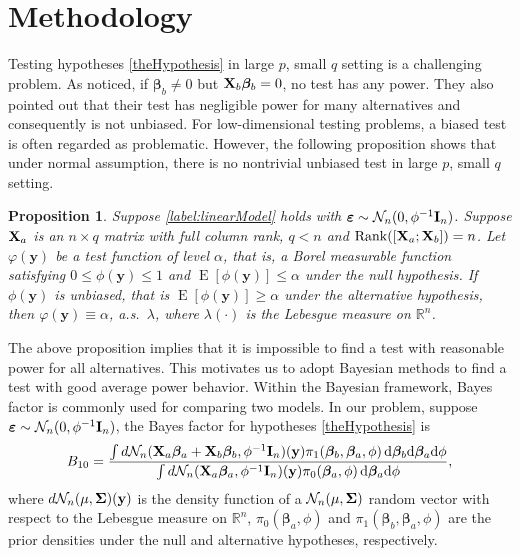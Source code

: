 \documentclass[11pt]{article}
\DeclareMathOperator{\myRank}{Rank}
\DeclareMathOperator{\myE}{E}
\newcommand{\By}{\mathbf{y}}    \newcommand{\Bz}{\mathbf{z}}
\newcommand{\bfsym}[1]{\ensuremath{\boldsymbol{#1}}}
\def\bbeta{\bfsym \beta}
\theoremstyle{plain}
\newtheorem{proposition}{\quad\quad Proposition}
\theoremstyle{definition}
\theoremstyle{remark}
\begin{document}
\section{Methodology}\label{sec:methodology}
Testing hypotheses \eqref{theHypothesis} in large $p$, small $q$ setting is a challenging problem.
As \cite{Goeman2006} noticed, if $\bbeta_b \neq 0$ but $\BX_b \bbeta_b =0$, no test has any power.
They also pointed out that their test has negligible power for many alternatives and consequently is not unbiased.
For low-dimensional testing problems, a biased test is often regarded as problematic.
However, the following proposition shows that under normal assumption, there is no nontrivial unbiased test in large $p$, small $q$ setting.
\begin{proposition}\label{prop:unbiased}
    Suppose \eqref{label:linearModel} holds with
$\bepsilon\sim \mathcal N_n (0, \phi^{-1}\BI_n)$.
Suppose $\mathbf{X}_a$ is an $n\times q$ matrix with full column rank, $q<n$ and $\myRank( [\BX_a;\BX_b])=n$.
Let $\varphi(\By)$ be a test function of level $\alpha$, that is, a Borel measurable function satisfying $0\leq \phi(\By)\leq 1$ and $\myE [\phi(\By)]\leq \alpha$ under the null hypothesis.
If $\phi(\By)$ is unbiased, that is $\myE [\phi(\By)]\geq \alpha$ under the alternative hypothesis, then $\varphi(\By)\equiv\alpha$, a.s.\ $\lambda$, where $\lambda(\cdot)$ is the Lebesgue measure on $\mathbb R^n$.
\end{proposition}
The above proposition implies that it is impossible to find a test with reasonable power for all alternatives.
This motivates us to adopt Bayesian methods %
to find a test with good average power behavior.
Within the Bayesian framework, Bayes factor is commonly used for comparing two models.
In our problem, suppose $\bepsilon \sim \mathcal N_n (0,\phi^{-1} \BI_n)$, the Bayes factor for hypotheses \eqref{theHypothesis} is
\begin{equation*}
    B_{10}= \frac {
        \int d\mathcal N_n(\BX_a\bbeta_a + \BX_b\bbeta_b, \phi^{-1}\BI_n) (\By) \pi_1(\bbeta_b,\bbeta_a,\phi)\, \mathrm d\bbeta_b \mathrm d\bbeta_a \mathrm d\phi
}{
    \int d\mathcal N_n(\BX_a\bbeta_a, \phi^{-1} \BI_n)(\By) \pi_0(\bbeta_a,\phi) \, \mathrm d\bbeta_a \mathrm d\phi
    },
\end{equation*}
where $d\mathcal N_n(\mu, \bSigma)(\By)$ is the density function of a $\mathcal N_n(\mu,\bSigma) $ random vector with respect to the Lebesgue measure on $\mathbb R^n$,  $\pi_0(\bbeta_a,\phi)$ and $\pi_1(\bbeta_b,\bbeta_a,\phi)$ are the prior densities under the null and alternative hypotheses, respectively.
\end{document}
